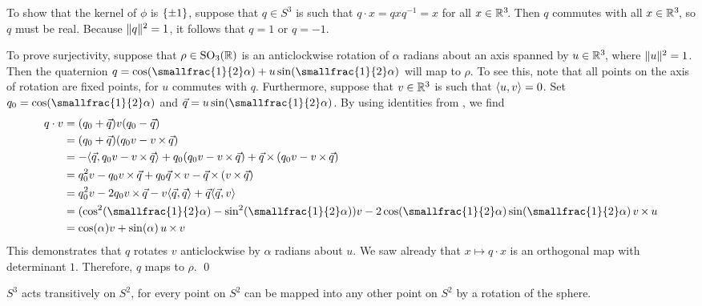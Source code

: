 To show that the kernel of $\phi$ is $\set{\pm 1}$,
suppose that $q \in S^3$ is such that $q \cdot x = q x q^{-1} = x$ for all $x \in \R^3\!$.
Then $q$ commutes with all $x \in \R^3\!$,
so $q$ must be real.
Because $\nsq{q} = 1$, it follows that $q = 1$ or $q = -1$.

To prove surjectivity,
suppose that $\rho \in \SOR$ is an anticlockwise rotation
of $\alpha$ radians about an axis spanned by $u \in \R^3\!$,
where $\nsq{u} = 1$.
Then the quaternion $q = \cos(\smallfrac{1}{2}\alpha) + u \sin(\smallfrac{1}{2}\alpha)$
will map to $\rho$.
To see this,
note that all points on the axis of rotation are fixed points,
for $u$ commutes with $q$.
Furthermore, suppose that $v \in \R^3$ is such that $\inp{u}{v} = 0$.
Set $q_0 = \cos(\smallfrac{1}{2}\alpha)$ and $\vec{q} = u \sin(\smallfrac{1}{2}\alpha)$.
By using identities from \parencite[p.~157]{szekeres2004},
we find
\newcommand*{\vv}{v} %
\newcommand*{\vq}{\vec{q}}
\begin{align*}
q \cdot v &= (q_0 + \vq) \vv (q_0 - \vq)
       \\ &= (q_0 + \vq) (q_0 \vv - \vv \times \vq)
       \\ &= -\inp{\vq}{q_0 \vv - \vv \times \vq} + q_0 (q_0 \vv - \vv \times \vq) + \vq \times {(q_0 \vv - \vv \times \vq)}
       \\ &= q_0^2 \vv - q_0 \vv \times \vq + q_0 \vq \times \vv - \vq \times {(\vv \times \vq)}
       \\ &= q_0^2 \vv - 2 q_0 \vv \times \vq - \vv \inp{\vq}{\vq} + \vq \inp{\vq}{\vv}
       \\ &= (\cos^2(\smallfrac{1}{2}\alpha) - \sin^2(\smallfrac{1}{2}\alpha)) v
           - 2 \cos(\smallfrac{1}{2}\alpha)\sin(\smallfrac{1}{2}\alpha) \, {v \times u}
       \\ &= \cos(\alpha) v + \sin(\alpha) \, {u \times v}
\end{align*}
This demonstrates that $q$ rotates $v$ anticlockwise by $\alpha$ radians about $u$.
We saw already that $x \mapsto q \cdot x$ is an orthogonal map with determinant $1$.
Therefore, $q$ maps to $\rho$.
\qed

$S^3$ acts transitively on $S^2\!$,
for every point on $S^2$ can be mapped
into any other point on $S^2$ by a rotation of the sphere.


